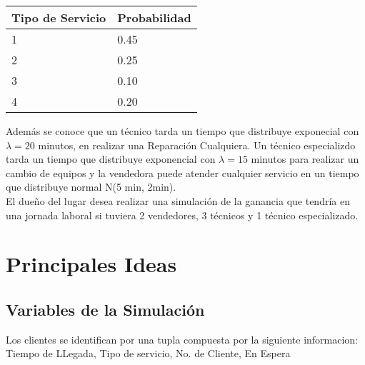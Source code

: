 \documentclass[a4paper,10pt,twocolumn]{article}
\begin{document}
\begin{table} [htbp]
	\begin{center}
		\begin{tabular}{|l|l|}
			\hline
			Tipo de Servicio & Probabilidad \\
			\hline \hline
			1 & 0.45 \\ \hline
			2 & 0.25 \\ \hline
			3 & 0.10 \\ \hline
			4 & 0.20 \\ \hline
			
		\end{tabular}
	\end{center}
\end{table}

Además se conoce que un técnico tarda un tiempo que distribuye exponecial con $\lambda = 20$ minutos, en realizar una Reparación Cualquiera. Un técnico especializdo tarda un tiempo que distribuye exponencial con $\lambda = 15$ minutos para
realizar un cambio de equipos y la vendedora puede atender cualquier servicio en un tiempo que distribuye normal N(5 min, 2min). \\
El dueño del lugar desea realizar una simulación de la ganancia que tendría en una jornada laboral si tuviera 2 vendedores, 3 técnicos y 1 técnico especializado.



\section{Principales Ideas}\label{sec:dev}



	\subsection{Variables de la Simulaci\'on}\label{sub:results}
	
	Los clientes se identifican por una tupla compuesta por la siguiente informacion: \\ 
	Tiempo de LLegada, Tipo de servicio, No. de Cliente, En Espera
\end{document}
